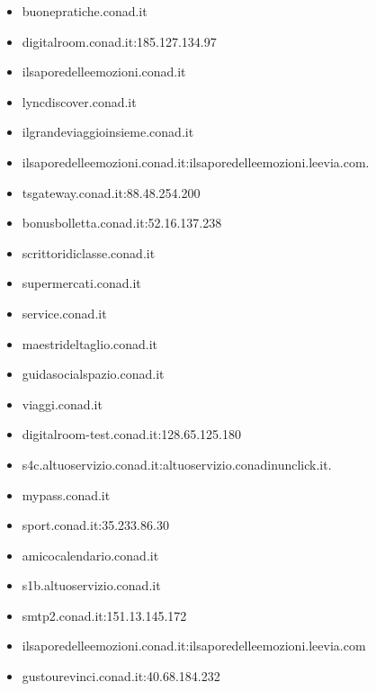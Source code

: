 \documentclass{article}
\begin{document}
\begin{itemize}
        \item buonepratiche.conad.it
    
        \item digitalroom.conad.it:185.127.134.97
    
        \item ilsaporedelleemozioni.conad.it
    
        \item lyncdiscover.conad.it
    
        \item ilgrandeviaggioinsieme.conad.it
    
        \item ilsaporedelleemozioni.conad.it:ilsaporedelleemozioni.leevia.com.
    
        \item tsgateway.conad.it:88.48.254.200
    
        \item bonusbolletta.conad.it:52.16.137.238
    
        \item scrittoridiclasse.conad.it
    
        \item supermercati.conad.it
    
        \item service.conad.it
    
        \item maestrideltaglio.conad.it
    
        \item guidasocialspazio.conad.it
    
        \item viaggi.conad.it
    
        \item digitalroom-test.conad.it:128.65.125.180
    
        \item s4c.altuoservizio.conad.it:altuoservizio.conadinunclick.it.
    
        \item mypass.conad.it
    
        \item sport.conad.it:35.233.86.30
    
        \item amicocalendario.conad.it
    
        \item s1b.altuoservizio.conad.it
    
        \item smtp2.conad.it:151.13.145.172
    
        \item ilsaporedelleemozioni.conad.it:ilsaporedelleemozioni.leevia.com
    
        \item gustourevinci.conad.it:40.68.184.232
    
\end{itemize}
\normalsize
\end{document}

